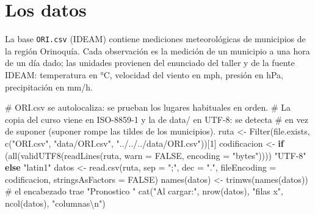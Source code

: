 \documentclass[oneside, openany, fontset=libertinus]{mitthesis}
\newenvironment{Shaded}{\begin{snugshade}}{\end{snugshade}}
\newcommand{\AttributeTok}[1]{\textcolor[rgb]{0.40,0.45,0.13}{#1}}
\newcommand{\CommentTok}[1]{\textcolor[rgb]{0.37,0.37,0.37}{#1}}
\newcommand{\ConstantTok}[1]{\textcolor[rgb]{0.56,0.35,0.01}{#1}}
\newcommand{\ControlFlowTok}[1]{\textcolor[rgb]{0.00,0.23,0.31}{\textbf{#1}}}
\newcommand{\DecValTok}[1]{\textcolor[rgb]{0.68,0.00,0.00}{#1}}
\newcommand{\FunctionTok}[1]{\textcolor[rgb]{0.28,0.35,0.67}{#1}}
\newcommand{\NormalTok}[1]{\textcolor[rgb]{0.00,0.23,0.31}{#1}}
\newcommand{\OtherTok}[1]{\textcolor[rgb]{0.00,0.23,0.31}{#1}}
\newcommand{\SpecialCharTok}[1]{\textcolor[rgb]{0.37,0.37,0.37}{#1}}
\newcommand{\StringTok}[1]{\textcolor[rgb]{0.13,0.47,0.30}{#1}}
\begin{document}


\chapter{Los datos}\label{datos}

La base \texttt{ORI.csv} (IDEAM) contiene mediciones meteorológicas de
municipios de la región Orinoquía. Cada observación es la medición de un
municipio a una hora de un día dado; las unidades provienen del
enunciado del taller y de la fuente IDEAM: temperatura en °C, velocidad
del viento en mph, presión en hPa, precipitación en mm/h.

\begin{Shaded}
\begin{Highlighting}[]
\CommentTok{\# ORI.csv se autolocaliza: se prueban los lugares habituales en orden.}
\CommentTok{\# La copia del curso viene en ISO{-}8859{-}1 y la de data/ en UTF{-}8: se detecta}
\CommentTok{\# en vez de suponer (suponer rompe las tildes de los municipios).}
\NormalTok{ruta }\OtherTok{\textless{}{-}} \FunctionTok{Filter}\NormalTok{(file.exists, }\FunctionTok{c}\NormalTok{(}\StringTok{"ORI.csv"}\NormalTok{, }\StringTok{"data/ORI.csv"}\NormalTok{,}
                              \StringTok{"../../../data/ORI.csv"}\NormalTok{))[}\DecValTok{1}\NormalTok{]}
\NormalTok{codificacion }\OtherTok{\textless{}{-}} \ControlFlowTok{if}\NormalTok{ (}\FunctionTok{all}\NormalTok{(}\FunctionTok{validUTF8}\NormalTok{(}\FunctionTok{readLines}\NormalTok{(ruta, }\AttributeTok{warn =} \ConstantTok{FALSE}\NormalTok{,}
                                            \AttributeTok{encoding =} \StringTok{"bytes"}\NormalTok{))))}
  \StringTok{"UTF{-}8"} \ControlFlowTok{else} \StringTok{"latin1"}
\NormalTok{datos }\OtherTok{\textless{}{-}} \FunctionTok{read.csv}\NormalTok{(ruta, }\AttributeTok{sep =} \StringTok{";"}\NormalTok{, }\AttributeTok{dec =} \StringTok{"."}\NormalTok{, }\AttributeTok{fileEncoding =}\NormalTok{ codificacion,}
                  \AttributeTok{stringsAsFactors =} \ConstantTok{FALSE}\NormalTok{)}
\FunctionTok{names}\NormalTok{(datos) }\OtherTok{\textless{}{-}} \FunctionTok{trimws}\NormalTok{(}\FunctionTok{names}\NormalTok{(datos))   }\CommentTok{\# el encabezado trae "Pronostico "}
\FunctionTok{cat}\NormalTok{(}\StringTok{"Al cargar:"}\NormalTok{, }\FunctionTok{nrow}\NormalTok{(datos), }\StringTok{"filas x"}\NormalTok{, }\FunctionTok{ncol}\NormalTok{(datos), }\StringTok{"columnas}\SpecialCharTok{\textbackslash{}n}\StringTok{"}\NormalTok{)}
\end{Highlighting}
\end{Shaded}
\end{document}
